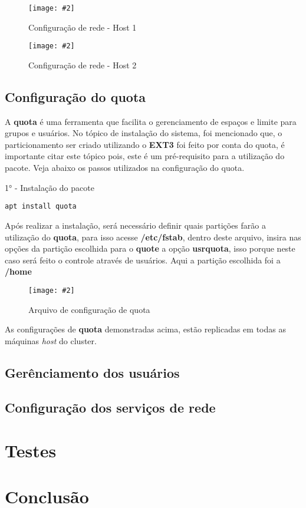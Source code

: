 \documentclass[
	12pt,				%
	openany,			%
	a4paper,			%
	chapter=TITLE,		%
	section=TITLE,		%
	english,
	brazil				%
]{abntex2}
\newcommand{\includeImage}[3] {

\begin{figure}[H]
 	 \centering
  		\texttt{[image: \#2]}
  	\caption{#3}
\end{figure}

}
\begin{document}
\includeImage{0.5}{imgs/2_configuracao_rede/host/1_host_1.png}{Configuração de rede - Host 1}
\includeImage{0.5}{imgs/2_configuracao_rede/host/1_host_2.png}{Configuração de rede - Host 2}

\subsection{Configuração do quota}

A \textbf{quota} é uma ferramenta que facilita o gerenciamento de espaços e limite para grupos e usuários. No tópico de instalação do sistema, foi mencionado que, o particionamento ser criado utilizando o \textbf{EXT3} foi feito por conta do quota, é importante citar este tópico pois, este é um pré-requisito para a utilização do pacote. Veja abaixo os passos utilizados na configuração do quota. 

1° - Instalação do pacote

\begin{lstlisting}
apt install quota
\end{lstlisting}

Após realizar a instalação, será necessário definir quais partições farão a utilização do \textbf{quota}, para isso acesse \textbf{/etc/fstab}, dentro deste arquivo, insira nas opções da partição escolhida para o \textbf{quote} a opção \textbf{usrquota}, isso porque neste caso será feito o controle através de usuários. Aqui a partição escolhida foi a \textbf{/home}

\includeImage{0.5}{imgs/3_configuracao_quota/1.png}{Arquivo de configuração de quota}

As configurações de \textbf{quota} demonstradas acima, estão replicadas em todas as máquinas \textit{host} do cluster. 

\subsection{Gerênciamento dos usuários}

\subsection{Configuração dos serviços de rede}

\section{Testes}

\section{Conclusão}
\end{document}
